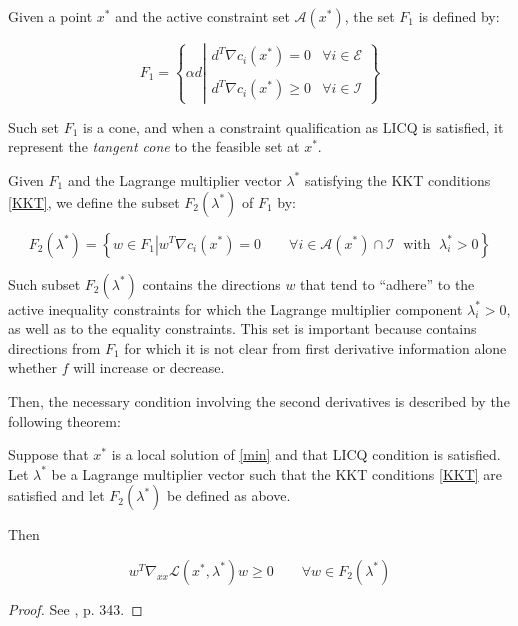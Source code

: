 \begin{defi}
Given a point $x^*$ and the active constraint set $\mathcal{A}(x^*)$, the set $F_1$  is defined by:

$$F_1 = \left\{ \alpha d \left| \begin{array}{ll}
d^T \nabla c_i(x^*) = 0 & \forall i \in \mathcal{E} \\
\\
d^T \nabla c_i(x^*) \geq 0 & \forall i \in \mathcal{I} \end{array} \right. \right\} $$
\end{defi}

Such set $F_1$ is a cone, and when a constraint qualification as LICQ is satisfied, it represent the \emph{tangent cone} to the feasible set at $x^*$.

\begin{defi}
Given $F_1$ and the Lagrange multiplier vector $\lambda^*$ satisfying the KKT conditions \eqref{KKT}, we define the subset $F_2(\lambda^*)$ of $F_1$ by:

$$ F_2 (\lambda^*) = \left\{ w \in F_1 \left| w^T \nabla c_i(x^*) = 0 \right. \qquad \forall i \in \mathcal{A}(x^*) \cap \mathcal{I} \; \mbox{ with }\; \lambda_i^* > 0 \right\} $$
\end{defi}

Such subset $F_2(\lambda^*)$ contains the directions $w$ that tend to ``adhere'' to the active inequality constraints for which the Lagrange multiplier component $\lambda_i^* > 0$, as well as to the equality constraints. This set is important because contains directions from $F_1$ for which it is not clear from first derivative information alone whether $f$ will increase or decrease.

Then, the necessary condition involving the second derivatives is described by the following theorem:

\begin{theorem}
Suppose that $x^*$ is a local solution of \eqref{min} and that LICQ condition is satisfied. Let $\lambda^*$ be a Lagrange multiplier vector such that the KKT conditions \eqref{KKT} are satisfied and let $F_2(\lambda^*)$ be defined as above.

Then

$$ w^T \nabla_{xx} \mathcal{L}(x^*,\lambda^*) w \geq 0 \qquad \forall w \in F_2(\lambda^*)$$

\begin{proof}
See \citep{nocedal}, p. 343.
\end{proof}
\end{theorem}

